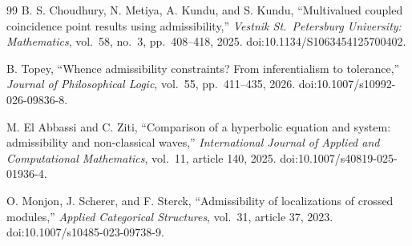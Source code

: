 \documentclass[11pt,a4paper]{article}
\theoremstyle{plain}
\theoremstyle{definition}
\begin{document}
\begin{thebibliography}{99}
B. S. Choudhury, N. Metiya, A. Kundu, and S. Kundu,
``Multivalued coupled coincidence point results using admissibility,''
\textit{Vestnik St.\ Petersburg University: Mathematics},
vol.\ 58, no.\ 3, pp.\ 408--418, 2025.
doi:10.1134/S1063454125700402.

B. Topey,
``Whence admissibility constraints? From inferentialism to tolerance,''
\textit{Journal of Philosophical Logic},
vol.\ 55, pp.\ 411--435, 2026.
doi:10.1007/s10992-026-09836-8.

M. El Abbassi and C. Ziti,
``Comparison of a hyperbolic equation and system:
admissibility and non-classical waves,''
\textit{International Journal of Applied and Computational Mathematics},
vol.\ 11, article 140, 2025.
doi:10.1007/s40819-025-01936-4.

O. Monjon, J. Scherer, and F. Sterck,
``Admissibility of localizations of crossed modules,''
\textit{Applied Categorical Structures},
vol.\ 31, article 37, 2023.
doi:10.1007/s10485-023-09738-9.

\end{thebibliography}
\end{document}

